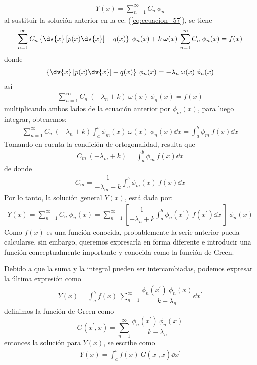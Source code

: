 \begin{align*}
Y(x) = \sum_{n=1}^{\infty} C_{n} \: \phi_{n}
\end{align*}
al sustituir la solución anterior en la ec. (\ref{eq:ecuacion_57}), se tiene
\begin{align*}
\sum_{n=1}^{\infty} C_{n} \left\{ \dv{x}  \left[ p(x) \dv{x} \right] + q(x) \right\} \: \phi_{n} (x) + k \: \omega (x) \: \sum_{n=1}^{\infty} C_{n} \: \phi_{n} (x) = f(x)
\end{align*}
donde
\begin{align*}
\left\{ \dv{x}  \left[ p(x) \dv{x} \right] + q(x) \right\} \: \phi_{n} (x) = - \lambda_{n} \: \omega (x) \: \phi_{n} (x)
\end{align*}
así
\begin{align*}
\sum_{n=1}^{\infty} C_{n} \: (-\lambda_{n} + k) \: \omega (x) \: \phi_{n} (x) = f(x)
\end{align*}
multiplicando ambos lados de la ecuación anterior por $\phi_{m}(x)$, para luego integrar, obtenemos:
\begin{align*}
\sum_{n=1}^{\infty} C_{n} \: (-\lambda_{n} + k) \int_{a}^{b} \phi_{m} (x) \: \omega (x) \: \phi_{n} (x) \dd{x} = \int_{a}^{b} \phi_{m} \: f(x) \dd{x}
\end{align*}
Tomando en cuenta la condición de ortogonalidad, resulta que
\begin{align*}
C_{m} \: (-\lambda_{m} + k) = \int_{a}^{b} \phi_{m} \: f(x) \dd{x}
\end{align*}
de donde
\begin{align*}
C_{m} = \dfrac{1}{-\lambda_{m} + k} \int_{a}^{b} \phi_{m} (x) \: f(x) \dd{x}
\end{align*}
Por lo tanto, la solución general $Y(x)$, está dada por:
\begin{align*}
Y(x) = \sum_{n=1}^{\infty} C_{n} \: \phi_{n} (x) = \sum_{n=1}^{\infty} \left[ \dfrac{1}{-\lambda_{n} + k} \int_{a}^{b} \phi_{n} (x^{\prime}) \: f(x^{\prime}) \dd{x^{\prime}} \right] \: \phi_{n} (x)
\end{align*}
Como $f(x)$ es una función conocida, probablemente la serie anterior pueda calcularse, sin embargo, queremos expresarla en forma diferente e introducir una función conceptualmente importante y conocida como la función de Green.
\par
Debido a que la suma y la integral pueden ser intercambiadas, podemos expresar la última expresión como
\begin{align*}
Y(x) = \int_{a}^{b} f(x) \: \sum_{n=1}^{\infty} \dfrac{\phi_{n}(x^{\prime}) \: \phi_{n}(x)}{k - \lambda_{n}} \dd{x^{\prime}}
\end{align*}
definimos la función de Green como
\begin{equation}
G(x^{\prime}, x) =  \sum_{n=1}^{\infty} \dfrac{\phi_{n}(x^{\prime}) \: \phi_{n}(x)}{k - \lambda_{n}}
\label{eq:ecuacion_58}
\end{equation}
entonces la solución para $Y(x)$, se escribe como
\begin{align*}
Y(x) = \int_{a}^{b} f(x) \: G(x^{\prime}, x) \dd{x^{\prime}}
\end{align*}
